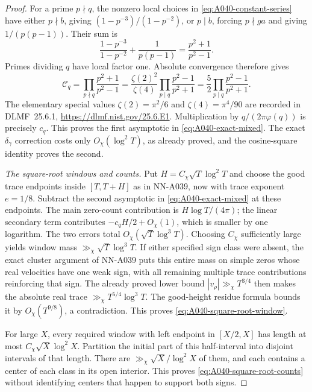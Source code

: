 \begin{proof}
For a prime $p\nmid q$, the nonzero local choices in
\eqref{eq:A040-constant-series} have either $p\nmid b$, giving
$(1-p^{-3})/(1-p^{-2})$, or $p\mid b$, forcing $p\nmid ga$
and giving $1/(p(p-1))$. Their sum is
\[
 \frac{1-p^{-3}}{1-p^{-2}}+\frac1{p(p-1)}
                          =\frac{p^2+1}{p^2-1}.
\]
Primes dividing $q$ have local factor one. Absolute convergence
therefore gives
\[
 \mathcal C_q=\prod_{p\nmid q}\frac{p^2+1}{p^2-1}
       =\frac{\zeta(2)^2}{\zeta(4)}
                    \prod_{p\mid q}\frac{p^2-1}{p^2+1}
       =\frac52\prod_{p\mid q}\frac{p^2-1}{p^2+1}.
\]
The elementary special values $\zeta(2)=\pi^2/6$ and
$\zeta(4)=\pi^4/90$ are recorded in DLMF~25.6.1,
\url{https://dlmf.nist.gov/25.6.E1}.
Multiplication by $q/(2\pi\varphi(q))$ is precisely $c_q$.
This proves the first asymptotic in
\eqref{eq:A040-exact-mixed}. The exact $\delta_\gamma$
correction costs only $O_\chi(\log^2T)$, as already proved,
and the cosine-square identity proves the second.

\emph{The square-root windows and counts.}
Put $H=C_\chi\sqrt T\log^2T$ and choose the good trace
endpoints inside $[T,T+H]$ as in NN-A039, now with trace
exponent $e=1/8$. Subtract the second asymptotic in
\eqref{eq:A040-exact-mixed} at these endpoints.
The main zero-count contribution is
$H\log T/(4\pi)$; the linear secondary term contributes
$-c_qH/2+O_\chi(1)$, which is smaller by one logarithm.
The two errors total $O_\chi(\sqrt T\log^3T)$.
Choosing $C_\chi$ sufficiently large yields window mass
$\gg_\chi\sqrt T\log^3T$.
If either specified sign class were absent, the exact cluster
argument of NN-A039 puts this entire mass on simple zeros
whose real velocities have one weak sign, with all remaining
multiple trace contributions reinforcing that sign.
The already proved lower bound $|v_\rho|\gg_\chi T^{3/4}$ then
makes the absolute real trace $\gg_\chi T^{5/4}\log^3T$.
The good-height residue formula bounds it by
$O_\chi(T^{9/8})$, a contradiction. This proves
\eqref{eq:A040-square-root-window}.

For large $X$, every required window with left endpoint in
$[X/2,X]$ has length at most $C_\chi\sqrt X\log^2X$.
Partition the initial part of this half-interval into disjoint
intervals of that length. There are
$\gg_\chi\sqrt X/\log^2X$ of them, and each contains a
center of each class in its open interior. This proves
\eqref{eq:A040-square-root-counts} without identifying
centers that happen to support both signs.
\end{proof}

